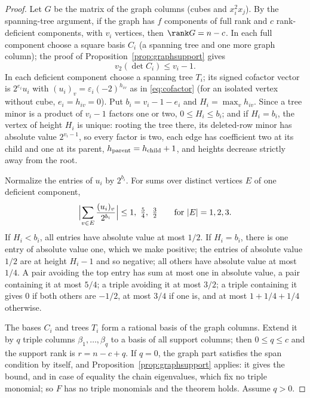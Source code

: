 \begin{proof}
Let $G$ be the matrix of the graph columns (cubes and $x_i^2x_j$). By the
spanning-tree argument, if the graph has $f$ components of full rank and $c$
rank-deficient components, with $v_i$ vertices, then $\rank G=n-c$. In each
full component choose a square basis $C_i$ (a spanning tree and one more graph
column); the proof of Proposition~\ref{prop:graphsupport} gives
\begin{equation}\label{eq:fullcomp}
 v_2(\det C_i)\le v_i-1 .
\end{equation}
In each deficient component choose a spanning tree $T_i$; its signed cofactor
vector is $2^{e_i}u_i$ with $(u_i)_v=\varepsilon_i(-2)^{h_{iv}}$ as in
\eqref{eq:cofactor} (for an isolated vertex without cube, $e_i=h_{iv}=0$).
Put $b_i=v_i-1-e_i$ and $H_i=\max_vh_{iv}$. Since a tree minor is a product of
$v_i-1$ factors one or two, $0\le H_i\le b_i$; and if $H_i=b_i$, the vertex of
height $H_i$ is unique: rooting the tree there, its deleted-row minor has
absolute value $2^{v_i-1}$, so every factor is two, each edge has coefficient
two at its child and one at its parent, $h_{\rm parent}=h_{\rm child}+1$, and
heights decrease strictly away from the root.

Normalize the entries of $u_i$ by $2^{b_i}$. For sums over distinct vertices
$E$ of one deficient component,
\begin{equation}\label{eq:smallsums}
 \Bigl|\sum_{v\in E}\frac{(u_i)_v}{2^{b_i}}\Bigr|\le1,\ \tfrac54,\ \tfrac32
 \qquad\text{for }|E|=1,2,3 .
\end{equation}
If $H_i<b_i$, all entries have absolute value at most $1/2$. If $H_i=b_i$,
there is one entry of absolute value one, which we make positive; the entries
of absolute value $1/2$ are at height $H_i-1$ and so negative; all others have
absolute value at most $1/4$. A pair avoiding the top entry has sum at most one
in absolute value, a pair containing it at most $5/4$; a triple avoiding it at
most $3/2$; a triple containing it gives $0$ if both others are $-1/2$, at
most $3/4$ if one is, and at most $1+1/4+1/4$ otherwise.

The bases $C_i$ and trees $T_i$ form a rational basis of the graph columns.
Extend it by $q$ triple columns $\beta_1,\dots,\beta_q$ to a basis of all
support columns; then $0\le q\le c$ and the support rank is $r=n-c+q$. If
$q=0$, the graph part satisfies the span condition by itself, and
Proposition~\ref{prop:graphsupport} applies: it gives the bound, and in case
of equality the chain eigenvalues, which fix no triple monomial; so $F$ has no
triple monomials and the theorem holds. Assume $q>0$.


\end{proof}

